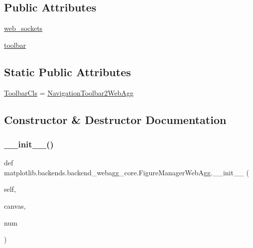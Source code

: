 \subsection*{Public Attributes}
\begin{DoxyCompactItemize}
\item 
\hyperlink{classmatplotlib_1_1backends_1_1backend__webagg__core_1_1FigureManagerWebAgg_a06a75f6a4913bff6d468b3cf01448073}{web\+\_\+sockets}
\item 
\hyperlink{classmatplotlib_1_1backends_1_1backend__webagg__core_1_1FigureManagerWebAgg_a49990811c06c74d238ef0c736dfc4238}{toolbar}
\end{DoxyCompactItemize}
\subsection*{Static Public Attributes}
\begin{DoxyCompactItemize}
\item 
\hyperlink{classmatplotlib_1_1backends_1_1backend__webagg__core_1_1FigureManagerWebAgg_a9d85ef4e234a4182f0531c412c797850}{Toolbar\+Cls} = \hyperlink{classmatplotlib_1_1backends_1_1backend__webagg__core_1_1NavigationToolbar2WebAgg}{Navigation\+Toolbar2\+Web\+Agg}
\end{DoxyCompactItemize}


\subsection{Constructor \& Destructor Documentation}
\mbox{\label{classmatplotlib_1_1backends_1_1backend__webagg__core_1_1FigureManagerWebAgg_a0c8cc76f34779613a6689bb9d9fdf875}} 
\subsubsection{\texorpdfstring{\+\_\+\+\_\+init\+\_\+\+\_\+()}{\_\_init\_\_()}}
{\footnotesize\ttfamily def matplotlib.\+backends.\+backend\+\_\+webagg\+\_\+core.\+Figure\+Manager\+Web\+Agg.\+\_\+\+\_\+init\+\_\+\+\_\+ (\begin{DoxyParamCaption}\item[{}]{self,  }\item[{}]{canvas,  }\item[{}]{num }\end{DoxyParamCaption})}



